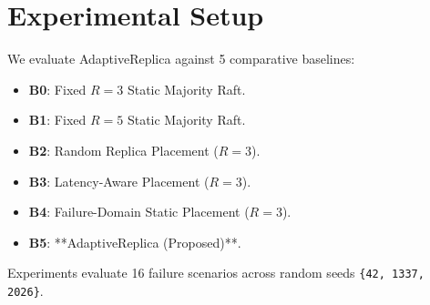 \section{Experimental Setup}
\label{sec:evaluation}

We evaluate AdaptiveReplica against 5 comparative baselines:
\begin{itemize}
    \item \textbf{B0}: Fixed $R=3$ Static Majority Raft.
    \item \textbf{B1}: Fixed $R=5$ Static Majority Raft.
    \item \textbf{B2}: Random Replica Placement ($R=3$).
    \item \textbf{B3}: Latency-Aware Placement ($R=3$).
    \item \textbf{B4}: Failure-Domain Static Placement ($R=3$).
    \item \textbf{B5}: **AdaptiveReplica (Proposed)**.
\end{itemize}

Experiments evaluate 16 failure scenarios across random seeds \texttt{\{42, 1337, 2026\}}.
